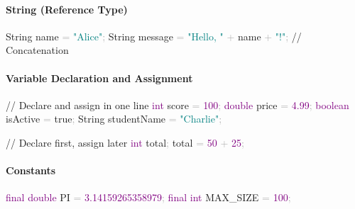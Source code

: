 \documentclass[
  justified,
  openright,
]{tufte-book}
\let\subsubsection\paragraph
\let\paragraph\paragraph
\newcommand{\BuiltInTok}[1]{#1}
\newcommand{\CommentTok}[1]{\textcolor{MidGray}{#1}}
\newcommand{\DataTypeTok}[1]{\textcolor{Purple}{#1}}
\newcommand{\DecValTok}[1]{\textcolor{Purple}{#1}}
\newcommand{\FloatTok}[1]{\textcolor{Purple}{#1}}
\newcommand{\KeywordTok}[1]{\textcolor{BrandBlue}{#1}}
\newcommand{\NormalTok}[1]{#1}
\newcommand{\OperatorTok}[1]{\textcolor{DarkGray}{#1}}
\newcommand{\StringTok}[1]{\textcolor{Teal}{#1}}
\newenvironment{Shaded}{%
  \begin{snugshade}
}{%
  \end{snugshade}
}
\let\subsubsection\paragraph
\let\paragraph\paragraph
\begin{document}
\subsubsection{String (Reference Type)}\label{string-reference-type}

\begin{Shaded}
\begin{Highlighting}[]
\BuiltInTok{String}\NormalTok{ name }\OperatorTok{=} \StringTok{"Alice"}\OperatorTok{;}
\BuiltInTok{String}\NormalTok{ message }\OperatorTok{=} \StringTok{"Hello, "} \OperatorTok{+}\NormalTok{ name }\OperatorTok{+} \StringTok{"!"}\OperatorTok{;}  \CommentTok{// Concatenation}
\end{Highlighting}
\end{Shaded}

\subsubsection{Variable Declaration and
Assignment}\label{variable-declaration-and-assignment}

\begin{Shaded}
\begin{Highlighting}[]
\CommentTok{// Declare and assign in one line}
\DataTypeTok{int}\NormalTok{ score }\OperatorTok{=} \DecValTok{100}\OperatorTok{;}
\DataTypeTok{double}\NormalTok{ price }\OperatorTok{=} \FloatTok{4.99}\OperatorTok{;}
\DataTypeTok{boolean}\NormalTok{ isActive }\OperatorTok{=} \KeywordTok{true}\OperatorTok{;}
\BuiltInTok{String}\NormalTok{ studentName }\OperatorTok{=} \StringTok{"Charlie"}\OperatorTok{;}

\CommentTok{// Declare first, assign later}
\DataTypeTok{int}\NormalTok{ total}\OperatorTok{;}
\NormalTok{total }\OperatorTok{=} \DecValTok{50} \OperatorTok{+} \DecValTok{25}\OperatorTok{;}
\end{Highlighting}
\end{Shaded}

\subsubsection{Constants}\label{constants}

\begin{Shaded}
\begin{Highlighting}[]
\DataTypeTok{final} \DataTypeTok{double}\NormalTok{ PI }\OperatorTok{=} \FloatTok{3.14159265358979}\OperatorTok{;}
\DataTypeTok{final} \DataTypeTok{int}\NormalTok{ MAX\_SIZE }\OperatorTok{=} \DecValTok{100}\OperatorTok{;}
\end{Highlighting}
\end{Shaded}
\end{document}
